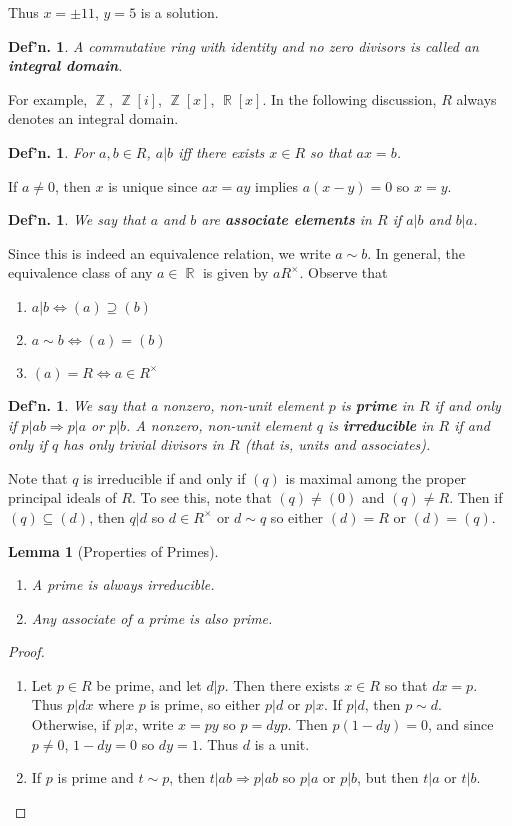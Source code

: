 \documentclass[12pt, a4paper]{book}
\DeclareMathOperator{\Z}{\mathbb{Z}}
\DeclareMathOperator{\R}{\mathbb{R}}
\newtheorem{lemma}[theorem]{Lemma}
\newtheorem{definition}[theorem]{Def'n.}
\theoremstyle{nonumberplain}
\newtheorem{proof}{Proof}
\begin{document}
Thus $x=\pm 11$, $y=5$ is a solution.
\begin{definition}
    A commutative ring with identity and no zero divisors is called an \textbf{integral domain}.
\end{definition}
For example, $\Z$, $\Z[i]$, $\Z[x]$, $\R[x]$.
In the following discussion, $R$ always denotes an integral domain.
\begin{definition}
    For $a,b\in R$, $a|b$ iff there exists $x\in R$ so that $ax=b$.
\end{definition}
If $a\neq 0$, then $x$ is unique since $ax=ay$ implies $a(x-y)=0$ so $x=y$.
\begin{definition}
    We say that $a$ and $b$ are \textbf{associate elements} in $R$ if $a|b$ and $b|a$.
\end{definition}
Since this is indeed an equivalence relation, we write $a\sim b$.
In general, the equivalence class of any $a\in\R$ is given by $aR^\times$.
Observe that
\begin{enumerate}[nolistsep]
    \item $a|b\Leftrightarrow (a)\supseteq(b)$
    \item $a\sim b\Leftrightarrow (a)=(b)$
    \item $(a)=R\Leftrightarrow a\in R^\times$
\end{enumerate}
\begin{definition}
    We say that a nonzero, non-unit element $p$ is \textbf{prime} in $R$ if and only if $p|ab\Rightarrow p|a$ or $p|b$.
    A nonzero, non-unit element $q$ is \textbf{irreducible} in $R$ if and only if $q$ has only trivial divisors in $R$ (that is, units and associates).
\end{definition}
Note that $q$ is irreducible if and only if $(q)$ is maximal among the proper principal ideals of $R$.
To see this, note that $(q)\neq(0)$ and $(q)\neq R$.
Then if $(q)\subseteq(d)$, then $q|d$ so $d\in R^\times$ or $d\sim q$ so either $(d)=R$ or $(d)=(q)$.
\begin{lemma}[Properties of Primes]
    \begin{enumerate}[nolistsep]
        \item A prime is always irreducible.
        \item Any associate of a prime is also prime.
    \end{enumerate}
\end{lemma}
\begin{proof}
    \begin{enumerate}
        \item Let $p\in R$ be prime, and let $d|p$.
            Then there exists $x\in R$ so that $dx=p$.
            Thus $p|dx$ where $p$ is prime, so either $p|d$ or $p|x$.
            If $p|d$, then $p\sim d$.
            Otherwise, if $p|x$, write $x=py$ so $p=dyp$.
            Then $p(1-dy)=0$, and since $p\neq 0$, $1-dy=0$ so $dy=1$.
            Thus $d$ is a unit.
        \item If $p$ is prime and $t\sim p$, then $t|ab\Rightarrow p|ab$ so $p|a$ or $p|b$, but then $t|a$ or $t|b$.
    \end{enumerate}
\end{proof}
\end{document}
